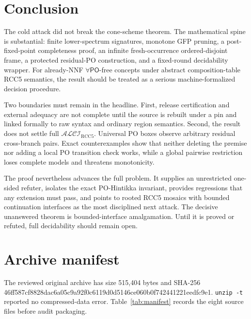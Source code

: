 \documentclass[11pt]{article}
\newcommand{\PO}{\mathsf{PO}}
\newcommand{\code}[1]{\texttt{#1}}
\newcommand{\sha}[2]{{\scriptsize\ttfamily #1\linebreak #2}}
\begin{document}
\section{Conclusion}

The cold attack did not break the cone-scheme theorem. The mathematical spine is
substantial: finite lower-spectrum signatures, monotone GFP pruning, a post-fixed-point
completeness proof, an infinite fresh-occurrence ordered-disjoint frame, a protected
residual-PO construction, and a fixed-round decidability wrapper. For already-NNF
$\forall\PO$-free concepts under abstract composition-table RCC5 semantics, the result
should be treated as a serious machine-formalized decision procedure.

Two boundaries must remain in the headline. First, release certification and external
adequacy are not complete until the source is rebuilt under a pin and linked formally
to raw syntax and ordinary region semantics. Second, the result does not settle full
$\mathcal{ALCI}_{\mathrm{RCC5}}$. Universal PO boxes observe arbitrary residual
cross-branch pairs. Exact counterexamples show that neither deleting the premise nor
adding a local PO transition check works, while a global pairwise restriction loses
complete models and threatens monotonicity.

The proof nevertheless advances the full problem. It supplies an unrestricted
one-sided refuter, isolates the exact PO-Hintikka invariant, provides regressions that
any extension must pass, and points to rooted RCC5 mosaics with bounded continuation
interfaces as the most disciplined next attack. The decisive unanswered theorem is
bounded-interface amalgamation. Until it is proved or refuted, full decidability should
remain open.

\appendix

\section{Archive manifest}

The reviewed original archive has size 515,404 bytes and SHA-256
\sha{46ff587cf8828dac6a05c9a92f0c6119}{d0d5146ce060b0f742441221eedfc9e1}.
\code{unzip -t} reported no compressed-data error. Table~\ref{tab:manifest} records the
eight source files before audit packaging.
\end{document}
